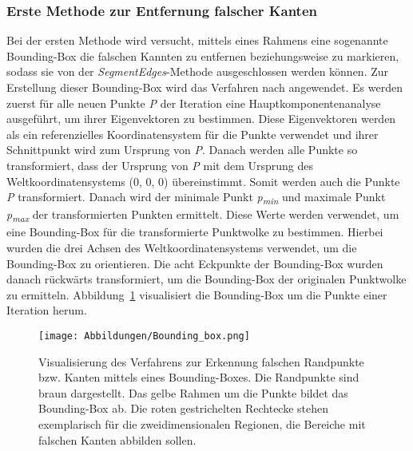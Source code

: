 \subsubsection{Erste Methode zur Entfernung falscher Kanten}
Bei der ersten Methode wird versucht, mittels eines Rahmens \textendash{} eine sogenannte Bounding-Box \textendash{} die falschen Kannten zu entfernen beziehungsweise zu markieren, sodass sie von der \textit{SegmentEdges}-Methode ausgeschlossen werden können. Zur Erstellung dieser Bounding-Box wird das Verfahren nach \textcite{mccormick_find_2015} angewendet. Es werden zuerst für alle neuen Punkte \textit{P} der Iteration eine Hauptkomponentenanalyse ausgeführt, um ihrer Eigenvektoren zu bestimmen. Diese Eigenvektoren werden als ein referenzielles Koordinatensystem für die Punkte verwendet und ihrer Schnittpunkt wird zum Ursprung von \textit{P}. Danach werden alle Punkte so transformiert, dass der Ursprung von \textit{P} mit dem Ursprung des Weltkoordinatensystems (0, 0, 0) übereinstimmt. Somit werden auch die Punkte \textit{P} transformiert. Danach wird der minimale Punkt \textit{p\textsubscript{min}} und maximale Punkt \textit{p\textsubscript{max}} der transformierten Punkten ermittelt. Diese Werte werden verwendet, um eine Bounding-Box für die transformierte Punktwolke zu bestimmen. Hierbei wurden die drei Achsen des Weltkoordinatensystems verwendet, um die Bounding-Box zu orientieren. Die acht Eckpunkte der Bounding-Box wurden danach rückwärts transformiert, um die Bounding-Box der originalen Punktwolke zu ermitteln. Abbildung~\ref{fig: bounding_box} visualisiert die Bounding-Box um die Punkte einer Iteration herum.

\begin{figure}[h]
	\texttt{[image: Abbildungen/Bounding\_box.png]}
	\centering
	\caption[Entfernung falscher Randpunkte mittels Bounding-Boxen]{Visualisierung des Verfahrens zur Erkennung falschen Randpunkte bzw. Kanten mittels eines Bounding-Boxes. Die Randpunkte sind braun dargestellt. Das gelbe Rahmen um die Punkte bildet das Bounding-Box ab. Die roten gestrichelten Rechtecke stehen exemplarisch für die zweidimensionalen Regionen, die Bereiche mit falschen Kanten abbilden sollen.}
	\label{fig: bounding_box}
\end{figure}

